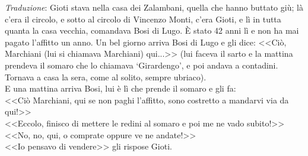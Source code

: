 \noindent \textit{Traduzione}: Gioti stava nella casa dei Zalambani, quella che hanno buttato giù; là c'era il circolo, e sotto al circolo di Vincenzo Monti, c'era Gioti, e lì in tutta quanta la casa vecchia, comandava Bosi di Lugo. È stato 42 anni lì e non ha mai pagato l'affitto un anno. Un bel giorno arriva Bosi di Lugo e gli dice: <<Ciò, Marchiani (lui si chiamava Marchiani) qui...>> (lui faceva il sarto e la mattina prendeva il somaro che lo chiamava `Girardengo', e poi andava a contadini. Tornava a casa la sera, come al solito, sempre ubriaco).\\
\indent E una mattina arriva Bosi, lui è lì che prende il somaro e gli fa:\\
\indent <<Ciò Marchiani, qui se non paghi l'affitto, sono costretto a mandarvi via da qui!>>\\
\indent <<Eccolo, finisco di mettere le redini al somaro e poi me ne vado subito!>>\\
\indent <<No, no, qui, o comprate oppure ve ne andate!>>\\
\indent <<Io pensavo di vendere>> gli rispose Gioti.\\




























